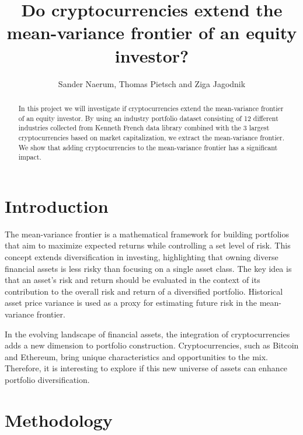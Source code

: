 \documentclass[12pt,a4paper]{article}
\title{Do cryptocurrencies extend the mean-variance frontier of an equity investor?}
\author{Sander Naerum, Thomas Pietsch and Ziga Jagodnik}
\begin{document}

\maketitle

\vspace{1cm}

\begin{abstract}
\noindent In this project we will investigate if cryptocurrencies extend the mean-variance frontier of an equity investor. 
By using an industry portfolio dataset consisting of 12 different industries collected from Kenneth French data library 
combined with the 3 largest cryptocurrencies based on market capitalization, we extract the mean-variance frontier. 
We show that adding cryptocurrencies to the mean-variance frontier has a significant impact.

\end{abstract}

\clearpage
\tableofcontents
\clearpage
{}
\setcounter{page}{1}

\section{Introduction}\label{sec:intro}
The mean-variance frontier is a mathematical framework for building portfolios that aim to maximize expected returns 
while controlling a set level of risk. This concept extends diversification in investing, highlighting that owning diverse 
financial assets is less risky than focusing on a single asset class. The key idea is that an asset's risk and return should 
be evaluated in the context of its contribution to the overall risk and return of a diversified portfolio. Historical asset 
price variance is used as a proxy for estimating future risk in the mean-variance frontier.

\noindent In the evolving landscape of financial assets, the integration of cryptocurrencies adds a new dimension to portfolio
 construction. Cryptocurrencies, such as Bitcoin and Ethereum, bring unique characteristics and opportunities to the mix. 
 Therefore, it is interesting to explore if this new universe of assets can enhance portfolio diversification. 

\section{Methodology}\label{sec:methods}
\end{document}
